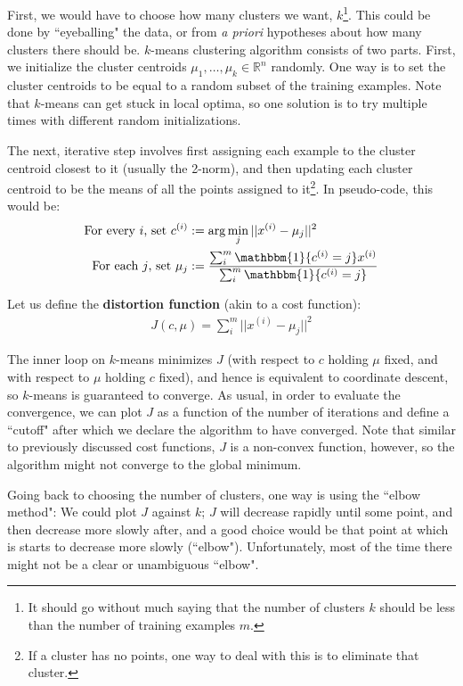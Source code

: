 \documentclass[letterpaper,10pt]{article}
\begin{document}
First, we would have to choose how many clusters we want, $k$\footnote{It should go without much saying that the number of clusters $k$ should be less than the number of training examples $m$.}. This could be done by ``eyeballing" the data, or from \textit{a priori} hypotheses about how many clusters there should be. $k$-means clustering algorithm consists of two parts. First, we initialize the cluster centroids $\mu_1,\ldots,\mu_k \in \mathbb{R}^n$ randomly. One way is to set the cluster centroids to be equal to a random subset of the training examples. Note that $k$-means can get stuck in local optima, so one solution is to try multiple times with different random initializations.


The next, iterative step involves first assigning each example to the cluster centroid closest to it (usually the 2-norm), and then updating each cluster centroid to be the means of all the points assigned to it\footnote{If a cluster has no points, one way to deal with this is to eliminate that cluster.}. In pseudo-code, this would be:
\begin{align}
\text{For every $i$, set } c^{(i)} &:= \arg \min_j ||x^{(i)} - \mu_j ||^2 \\
\text{For each $j$, set } \mu_j &:= \frac{\sum_i^m \mathbbm{1} \{c^{(i)} = j\} x^{(i)}}{\sum_i^m \mathbbm{1}\{ c^{(i)} = j\}} \\
\end{align}

Let us define the \textbf{distortion function} (akin to a cost function):
\begin{align}
J(c,\mu) = \sum_i^m ||x^{(i)} - \mu_j ||^2
\end{align}

The inner loop on $k$-means minimizes $J$ (with respect to $c$ holding $\mu$ fixed, and with respect to $\mu$ holding $c$ fixed), and hence is equivalent to coordinate descent, so $k$-means is guaranteed to converge. As usual, in order to evaluate the convergence, we can plot $J$ as a function of the number of iterations and define a ``cutoff" after which we declare the algorithm to have converged. Note that similar to previously discussed cost functions, $J$ is a non-convex function, however, so the algorithm might not converge to the global minimum. 



Going back to choosing the number of clusters, one way is using the ``elbow method": We could plot $J$ against $k$; $J$ will decrease rapidly until some point, and then decrease more slowly after, and a good choice would be that point at which is starts to decrease more slowly (``elbow"). Unfortunately, most of the time there might not be a clear or unambiguous ``elbow". 
\end{document}
